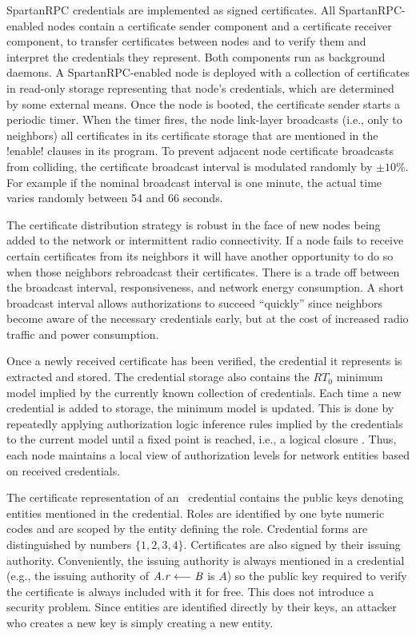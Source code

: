 SpartanRPC credentials are implemented as signed certificates. All SpartanRPC-enabled nodes
contain a certificate sender component and a certificate receiver component, to transfer
certificates between nodes and to verify them and interpret the credentials they represent. Both
components run as background daemons. A SpartanRPC-enabled node is deployed with a collection of
certificates in read-only storage representing that node's credentials, which are determined by
some external means. Once the node is booted, the certificate sender starts a periodic timer.
When the timer fires, the node link-layer broadcasts (i.e., only to neighbors) all certificates
in its certificate storage that are mentioned in the !enable! clauses in its program. To prevent
adjacent node certificate broadcasts from colliding, the certificate broadcast interval is
modulated randomly by $\pm 10$\%. For example if the nominal broadcast interval is one minute,
the actual time varies randomly between 54 and 66 seconds.

The certificate distribution strategy is robust in the face of new nodes being added to the
network or intermittent radio connectivity. If a node fails to receive certain certificates from
its neighbors it will have another opportunity to do so when those neighbors rebroadcast their
certificates. There is a trade off between the broadcast interval, responsiveness, and network
energy consumption. A short broadcast interval allows authorizations to succeed ``quickly''
since neighbors become aware of the necessary credentials early, but at the cost of increased
radio traffic and power consumption.

Once a newly received certificate has been verified, the credential it represents is extracted
and stored. The credential storage also contains the $RT_0$ minimum model implied by the
currently known collection of credentials. Each time a new credential is added to storage, the
minimum model is updated. This is done by repeatedly applying authorization logic inference
rules implied by the credentials to the current model until a fixed point is reached, i.e., a
logical closure \cite{Li:DCFTML}. Thus, each node maintains a local view of authorization levels
for network entities based on received credentials.

The certificate representation of an \RT\ credential contains the public keys denoting entities
mentioned in the credential. Roles are identified by one byte numeric codes and are scoped by
the entity defining the role. Credential forms are distinguished by numbers $\{ 1, 2, 3, 4 \}$.
Certificates are also signed by their issuing authority. Conveniently, the issuing authority is
always mentioned in a credential (e.g., the issuing authority of $\mathit{A.r} \stackrel{}{\longleftarrow} \mathit{B}$ is $A$) so
the public key required to verify the certificate is always included with it for free. This does
not introduce a security problem. Since entities are identified directly by their keys, an
attacker who creates a new key is simply creating a new entity.

